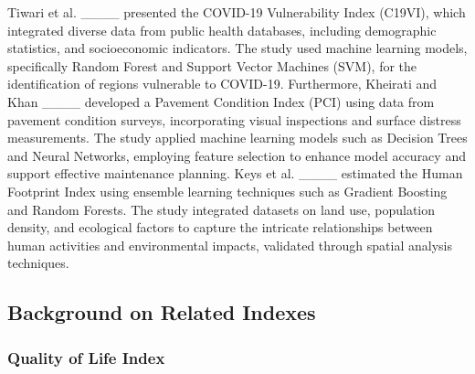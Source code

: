  Tiwari et al.  ____ presented the COVID-19 Vulnerability Index (C19VI), which integrated diverse data from public health databases, including demographic statistics, and socioeconomic indicators. The study used machine learning models, specifically Random Forest and Support Vector Machines (SVM), for the identification of regions vulnerable to COVID-19. Furthermore,   Kheirati and Khan ____ developed a Pavement Condition Index (PCI) using data from pavement condition surveys, incorporating visual inspections and surface distress measurements. The study applied machine learning models such as Decision Trees and Neural Networks, employing feature selection to enhance model accuracy and support effective maintenance planning. Keys et al. ____ estimated the Human Footprint Index using ensemble learning techniques such as Gradient Boosting and Random Forests. The study integrated datasets on land use, population density, and ecological factors to capture the intricate relationships between human activities and environmental impacts, validated through spatial analysis techniques. 



\subsection{Background on Related Indexes}

\subsubsection{Quality of Life Index}


